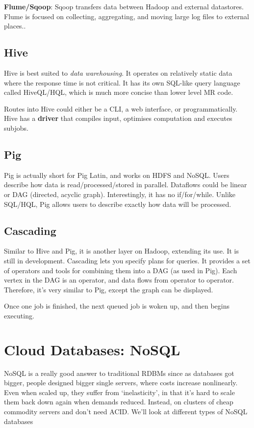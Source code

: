\documentclass[11pt,a4paper,titlepage,dvipsnames,cmyk]{scrartcl}
\begin{document}
\textbf{Flume/Sqoop}: Sqoop transfers data between Hadoop and external datastores. Flume is focused on collecting, aggregating, and moving large log files to external places..

\subsection{Hive}
Hive is best suited to \textit{data warehousing}. It operates on relatively static data where the response time is not critical. It has its own SQL-like query language called HiveQL/HQL, which is much more concise than lower level MR code.

Routes into Hive could either be a CLI, a web interface, or programmatically. Hive has a \textbf{driver} that compiles input, optimises computation and executes subjobs.

\subsection{Pig}
Pig is actually short for Pig Latin, and works on HDFS and NoSQL. Users describe how data is read/processed/stored in parallel. Dataflows could be linear or DAG (directed, acyclic graph). Interestingly, it has no if/for/while. Unlike SQL/HQL, Pig allows users to describe exactly how data will be processed.

\subsection{Cascading}
Similar to Hive and Pig, it is another layer on Hadoop, extending its use. It is still in development. Cascading lets you specify plans for queries. It provides a set of operators and tools for combining them into a DAG (as used in Pig). Each vertex in the DAG is an operator, and data flows from operator to operator. Therefore, it's very similar to Pig, except the graph can be displayed.

Once one job is finished, the next queued job is woken up, and then begins executing.

\section{Cloud Databases: NoSQL}
NoSQL is a really good answer to traditional RDBMs since as databases got bigger, people designed bigger single servers, where costs increase nonlinearly. Even when scaled up, they suffer from `inelasticity', in that it's hard to scale them back down again when demands reduced. Instead,  on clusters of cheap commodity servers and don't need ACID. We'll look at different types of NoSQL databases
\end{document}
